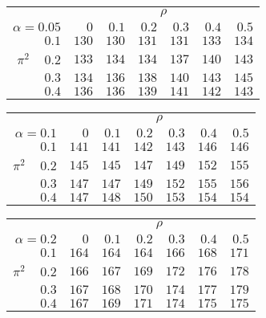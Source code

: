 \begin{tabular}{r|rrrrrr}
\hline\hline
 &\multicolumn{6}{c}{$\rho$} \\ 
 $\alpha = 0.05$ & $0$ & $0.1$ & $0.2$ & $0.3$ & $0.4$ & $0.5$ \\ 
 \hline$0.1$ & $130$ & $130$ & $131$ & $131$ & $133$ & $134$\\ 
$\pi^2\;\;\;$ $0.2$ & $133$ & $134$ & $134$ & $137$ & $140$ & $143$\\ 
$0.3$ & $134$ & $136$ & $138$ & $140$ & $143$ & $145$\\ 
$0.4$ & $136$ & $136$ & $139$ & $141$ & $142$ & $143$\\ 
 \hline 
 \end{tabular}
 
 \vspace{2em} 
 
\begin{tabular}{r|rrrrrr}
\hline\hline
 &\multicolumn{6}{c}{$\rho$} \\ 
 $\alpha = 0.1$ & $0$ & $0.1$ & $0.2$ & $0.3$ & $0.4$ & $0.5$ \\ 
 \hline$0.1$ & $141$ & $141$ & $142$ & $143$ & $146$ & $146$\\ 
$\pi^2\;\;\;$ $0.2$ & $145$ & $145$ & $147$ & $149$ & $152$ & $155$\\ 
$0.3$ & $147$ & $147$ & $149$ & $152$ & $155$ & $156$\\ 
$0.4$ & $147$ & $148$ & $150$ & $153$ & $154$ & $154$\\ 
 \hline 
 \end{tabular}
 
 \vspace{2em} 
 
\begin{tabular}{r|rrrrrr}
\hline\hline
 &\multicolumn{6}{c}{$\rho$} \\ 
 $\alpha = 0.2$ & $0$ & $0.1$ & $0.2$ & $0.3$ & $0.4$ & $0.5$ \\ 
 \hline$0.1$ & $164$ & $164$ & $164$ & $166$ & $168$ & $171$\\ 
$\pi^2\;\;\;$ $0.2$ & $166$ & $167$ & $169$ & $172$ & $176$ & $178$\\ 
$0.3$ & $167$ & $168$ & $170$ & $174$ & $177$ & $179$\\ 
$0.4$ & $167$ & $169$ & $171$ & $174$ & $175$ & $175$\\ 
 \hline 
 \end{tabular}